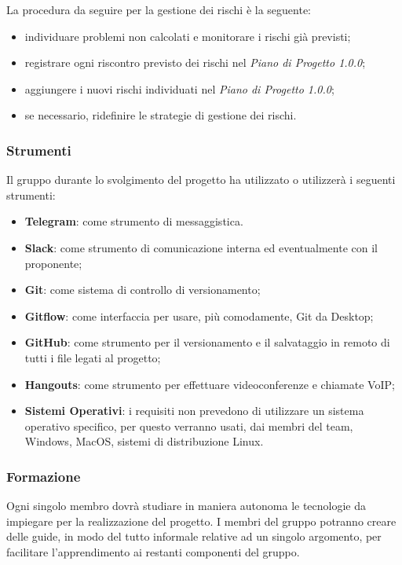    				La procedura da seguire per la gestione dei rischi è la seguente:
   				\begin{itemize}
   					\item individuare problemi non calcolati e monitorare i rischi già previsti;
   					\item registrare ogni riscontro previsto dei rischi nel \textit{Piano di Progetto 1.0.0};
   					\item aggiungere i nuovi rischi individuati nel \textit{Piano di Progetto 1.0.0};
   					\item  se necessario, ridefinire le strategie di gestione dei rischi.
   				\end{itemize}
   		\subsubsection{Strumenti}
   			Il gruppo durante lo svolgimento del progetto ha utilizzato o utilizzerà i seguenti strumenti:
   			\begin{itemize}
   				\item \textbf{Telegram}: come strumento di messaggistica.
   				\item \textbf{Slack}: come strumento di comunicazione interna ed eventualmente con il proponente;
   				\item \textbf{Git}: come sistema di controllo di versionamento;
   				\item \textbf{Gitflow}: come interfaccia per usare, più comodamente, Git da Desktop;
   				\item \textbf{GitHub}: come strumento per il versionamento e il salvataggio in remoto di tutti i file legati al progetto;
   				\item \textbf{Hangouts}: come strumento per effettuare videoconferenze e chiamate VoIP;
   				\item \textbf{Sistemi Operativi}: i requisiti non prevedono di utilizzare un sistema operativo specifico, per questo verranno usati, dai membri del team, Windows, MacOS, sistemi di distribuzione Linux.
   			\end{itemize}
   		\subsubsection{Formazione}
   			Ogni singolo membro dovrà studiare in maniera autonoma le tecnologie da impiegare per la realizzazione del progetto. I membri del gruppo potranno creare delle guide, in modo del tutto informale relative ad un singolo argomento, per facilitare l'apprendimento ai restanti componenti del gruppo.

